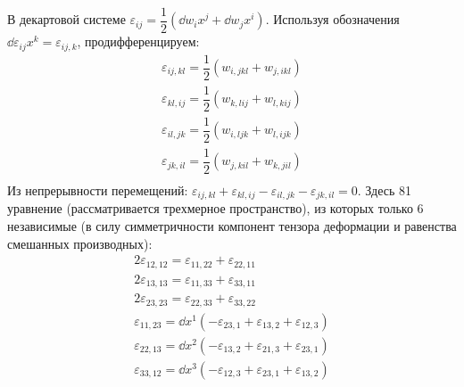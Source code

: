 В декартовой системе $\varepsilon_{ij} = \dfrac{1}{2}\left(\dd{w_i}{x^j}+ \dd{w_j}{x^i}\right)$. Используя обозначения $\dd{\varepsilon_{ij}}{x^k} = \varepsilon_{ij, k}$, продифференцируем:
\begin{gather*}
  \varepsilon_{ij, kl} = \dfrac{1}{2}(w_{i,jkl} + w_{j,ikl}) \\
  \varepsilon_{kl, ij} = \dfrac{1}{2}(w_{k,lij} + w_{l,kij}) \\
  \varepsilon_{il, jk} = \dfrac{1}{2}(w_{i,ljk} + w_{l,ijk}) \\
  \varepsilon_{jk, il} = \dfrac{1}{2}(w_{j,kil} + w_{k,jil}) \\
\end{gather*}
Из непрерывности перемещений: $\varepsilon_{ij, kl} + \varepsilon_{kl, ij} - \varepsilon_{il, jk} - \varepsilon_{jk, il} = 0$. Здесь 81 уравнение (рассматривается трехмерное пространство), из которых только 6 независимые (в силу симметричности компонент тензора деформации и равенства смешанных производных):
\begin{gather*}
  2\varepsilon_{12, 12} = \varepsilon_{11, 22} + \varepsilon_{22, 11} \\
  2\varepsilon_{13, 13} = \varepsilon_{11, 33} + \varepsilon_{33, 11} \\
  2\varepsilon_{23, 23} = \varepsilon_{22, 33} + \varepsilon_{33, 22} \\
  \varepsilon_{11, 23} = \dd{}{x^1}(-\varepsilon_{23, 1} + \varepsilon_{13, 2} + \varepsilon_{12, 3}) \\
  \varepsilon_{22, 13} = \dd{}{x^2}(-\varepsilon_{13, 2} + \varepsilon_{21, 3} + \varepsilon_{23, 1}) \\
  \varepsilon_{33, 12} = \dd{}{x^3}(-\varepsilon_{12, 3} + \varepsilon_{23, 1} + \varepsilon_{13, 2})
\end{gather*}
